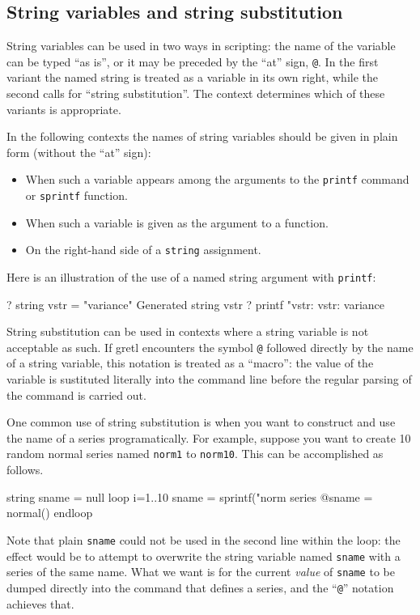 \subsection{String variables and string substitution}

String variables can be used in two ways in scripting: the name of the
variable can be typed ``as is'', or it may be preceded by the ``at''
sign, \verb|@|. In the first variant the named string is treated as a
variable in its own right, while the second calls for ``string
substitution''. The context determines which of these variants is
appropriate. 

In the following contexts the names of string variables should be
given in plain form (without the ``at'' sign):

\begin{itemize}
\item When such a variable appears among the arguments to the
  \texttt{printf} command or \texttt{sprintf} function.
\item When such a variable is given as the argument to a function.
\item On the right-hand side of a \texttt{string} assignment.
\end{itemize}

Here is an illustration of the use of a named string argument with
\texttt{printf}:
%
\begin{code}
? string vstr = "variance"
Generated string vstr
? printf "vstr: %
vstr:     variance
\end{code}

String substitution can be used in contexts where a string variable is
not acceptable as such. If gretl encounters the symbol \verb|@|
followed directly by the name of a string variable, this notation is
treated as a ``macro'': the value of the variable is sustituted
literally into the command line before the regular parsing of the
command is carried out.

One common use of string substitution is when you want to construct
and use the name of a series programatically. For example, suppose you
want to create 10 random normal series named \texttt{norm1} to
\texttt{norm10}. This can be accomplished as follows.
%
\begin{code}
string sname = null
loop i=1..10
  sname = sprintf("norm%
  series @sname = normal()
endloop
\end{code}
%
Note that plain \texttt{sname} could not be used in the second line
within the loop: the effect would be to attempt to overwrite the
string variable named \texttt{sname} with a series of the same
name. What we want is for the current \textit{value} of
\texttt{sname} to be dumped directly into the command that defines a
series, and the ``\verb|@|'' notation achieves that.

